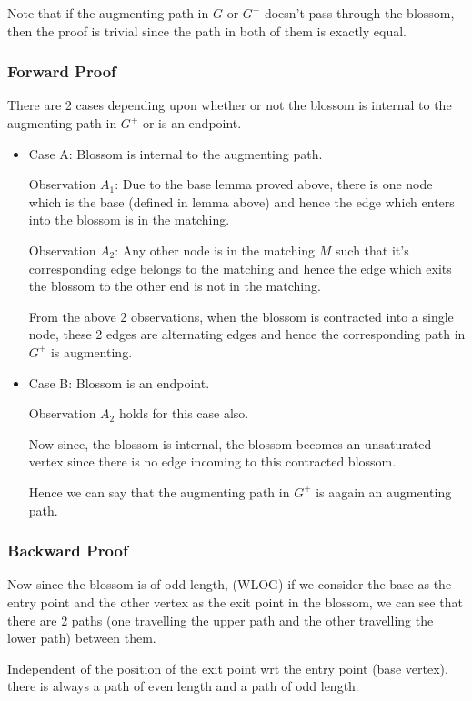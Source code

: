 \documentclass{article}
\begin{document}
Note that if the augmenting path in $G$ or $G^+$ doesn't pass through the blossom, then the proof is trivial since the path in both of them is exactly equal.

\subsubsection{Forward Proof}
There are 2 cases depending upon whether or not the blossom is internal to the augmenting path in $G^+$ or is an endpoint.
\begin{itemize}
    \item Case A: Blossom is internal to the augmenting path. 
        
        Observation $A_1$: Due to the base lemma proved above, there is one node which is the base (defined in lemma above) and hence the edge which enters into the blossom is in the matching.
        
        Observation $A_2$: Any other node is in the matching $M$ such that it's corresponding edge belongs to the matching and hence the edge which exits the blossom to the other end is not in the matching.
        
        From the above 2 observations, when the blossom is contracted into a single node, these 2 edges are alternating edges and hence the corresponding path in $G^+$ is augmenting.
    \item Case B: Blossom is an endpoint.
        
        Observation $A_2$ holds for this case also.
        
        Now since, the blossom is internal, the blossom becomes an unsaturated vertex since there is no edge incoming to this contracted blossom. 
        
        Hence we can say that the augmenting path in $G^+$ is aagain an augmenting path.
        
\end{itemize}


\subsubsection{Backward Proof}
Now since the blossom is of odd length, (WLOG) if we consider the base as the entry point and the other vertex as the exit point in the blossom, we can see that there are 2 paths (one travelling the upper path and the other travelling the lower path) between them. 

Independent of the position of the exit point wrt the entry point (base vertex), there is always a path of even length and a path of odd length. 
\end{document}
